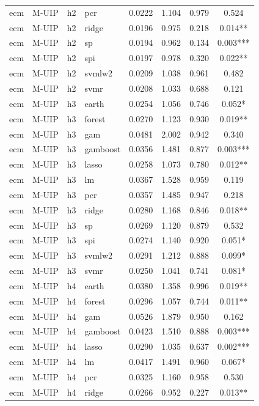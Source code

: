 \begin{ThreePartTable}
\begin{longtable}[t]{llclcccc}
ecm & M-UIP & h2 & pcr & 0.0222 & 1.104 & 0.979 & 0.524\\
ecm & M-UIP & h2 & ridge & 0.0196 & 0.975 & 0.218 & 0.014**\\
ecm & M-UIP & h2 & sp & 0.0194 & 0.962 & 0.134 & 0.003***\\
ecm & M-UIP & h2 & spi & 0.0197 & 0.978 & 0.320 & 0.022**\\
ecm & M-UIP & h2 & svmlw2 & 0.0209 & 1.038 & 0.961 & 0.482\\
ecm & M-UIP & h2 & svmr & 0.0208 & 1.033 & 0.688 & 0.121\\
\addlinespace
ecm & M-UIP & h3 & earth & 0.0254 & 1.056 & 0.746 & 0.052*\\
ecm & M-UIP & h3 & forest & 0.0270 & 1.123 & 0.930 & 0.019**\\
ecm & M-UIP & h3 & gam & 0.0481 & 2.002 & 0.942 & 0.340\\
ecm & M-UIP & h3 & gamboost & 0.0356 & 1.481 & 0.877 & 0.003***\\
ecm & M-UIP & h3 & lasso & 0.0258 & 1.073 & 0.780 & 0.012**\\
ecm & M-UIP & h3 & lm & 0.0367 & 1.528 & 0.959 & 0.119\\
ecm & M-UIP & h3 & pcr & 0.0357 & 1.485 & 0.947 & 0.218\\
ecm & M-UIP & h3 & ridge & 0.0280 & 1.168 & 0.846 & 0.018**\\
ecm & M-UIP & h3 & sp & 0.0269 & 1.120 & 0.879 & 0.532\\
ecm & M-UIP & h3 & spi & 0.0274 & 1.140 & 0.920 & 0.051*\\
ecm & M-UIP & h3 & svmlw2 & 0.0291 & 1.212 & 0.888 & 0.099*\\
ecm & M-UIP & h3 & svmr & 0.0250 & 1.041 & 0.741 & 0.081*\\
\addlinespace
ecm & M-UIP & h4 & earth & 0.0380 & 1.358 & 0.996 & 0.019**\\
ecm & M-UIP & h4 & forest & 0.0296 & 1.057 & 0.744 & 0.011**\\
ecm & M-UIP & h4 & gam & 0.0526 & 1.879 & 0.950 & 0.162\\
ecm & M-UIP & h4 & gamboost & 0.0423 & 1.510 & 0.888 & 0.003***\\
ecm & M-UIP & h4 & lasso & 0.0290 & 1.035 & 0.637 & 0.002***\\
ecm & M-UIP & h4 & lm & 0.0417 & 1.491 & 0.960 & 0.067*\\
ecm & M-UIP & h4 & pcr & 0.0325 & 1.160 & 0.958 & 0.530\\
ecm & M-UIP & h4 & ridge & 0.0266 & 0.952 & 0.227 & 0.013**\\

\end{longtable}
\end{ThreePartTable}

